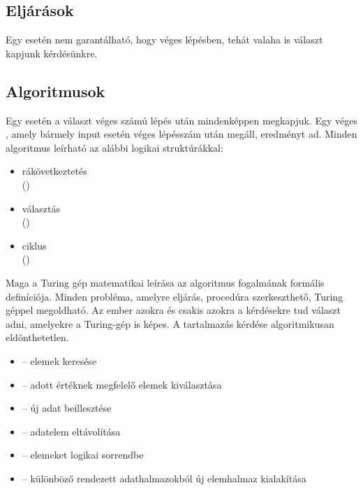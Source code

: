 \documentclass[../../main.tex]{subfiles}
\begin{document}
\subsection{Eljárások}

Egy  esetén nem garantálható, hogy véges lépésben,
tehát valaha is választ kapjunk kérdésünkre.

\subsection{Algoritmusok}

Egy  esetén a választ véges számú lépés után mindenképpen
megkapjuk. Egy véges , amely bármely input esetén
véges lépésszám után megáll, eredményt ad.
Minden algoritmus leírható az alábbi logikai struktúrákkal:
\begin{multicols}{3}
	\begin{itemize}
		\item rákövetkeztetés \\ ()
		\item választás \\ ()
		\item ciklus \\ ()
	\end{itemize}
\end{multicols}
Maga a Turing gép matematikai leírása az algoritmus fogalmának formális
definíciója. Minden probléma, amelyre eljárás, procedúra szerkeszthető,
Turing géppel megoldható. Az ember azokra és csakis azokra a kérdésekre
tud választ adni, amelyekre a Turing-gép is képes. A tartalmazás kérdése
algoritmikusan eldönthetetlen.
\begin{multicols}{2}
	\begin{itemize}
		\item {} – elemek keresése

		\item {} – adott értéknek megfelelő elemek kiválasztása

		\item {} – új adat beillesztése

		\item {} – adatelem eltávolítása

		\item {} – elemeket logikai sorrendbe

		\item {} – különböző rendezett
		      adathalmazokból új elemhalmaz kialakítása
	\end{itemize}
\end{multicols}
\end{document}
